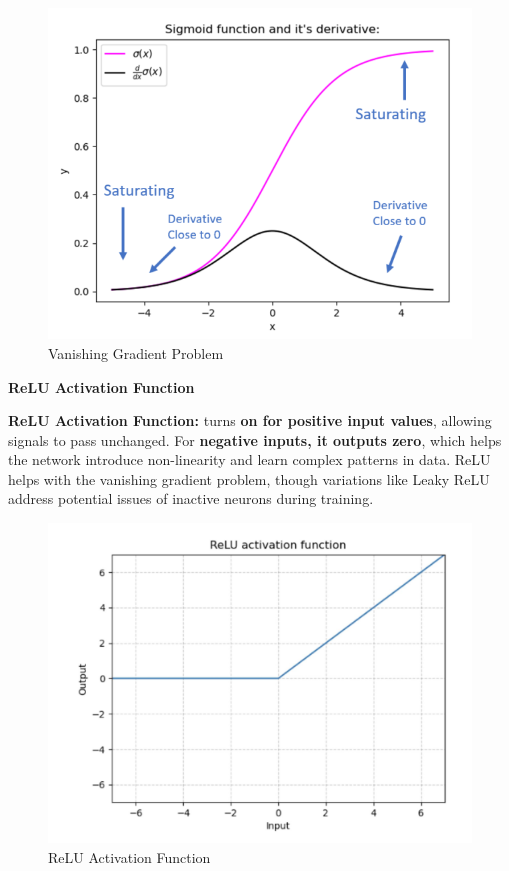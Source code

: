 \begin{figure}[h!t]
    \centering
    \includegraphics[width=0.5\linewidth]{vanishinggradientproblem.png}
    \caption{Vanishing Gradient Problem}
    \label{fig:enter-label}
\end{figure}

\newpage

\textbf{ReLU Activation Function}

\begin{definition}
\textbf{ ReLU Activation Function:} turns \textbf{on for positive input values}, allowing signals to pass unchanged. For \textbf{negative inputs, it outputs zero}, which helps the network introduce non-linearity and learn complex patterns in data. ReLU helps with the vanishing gradient problem, though variations like Leaky ReLU address potential issues of inactive neurons during training.
\end{definition}

\begin{figure}[h!t]
    \centering
    \includegraphics[width=0.5\linewidth]{ReLU.png}
    \caption{ReLU Activation Function}
    \label{fig:enter-label}
\end{figure}

